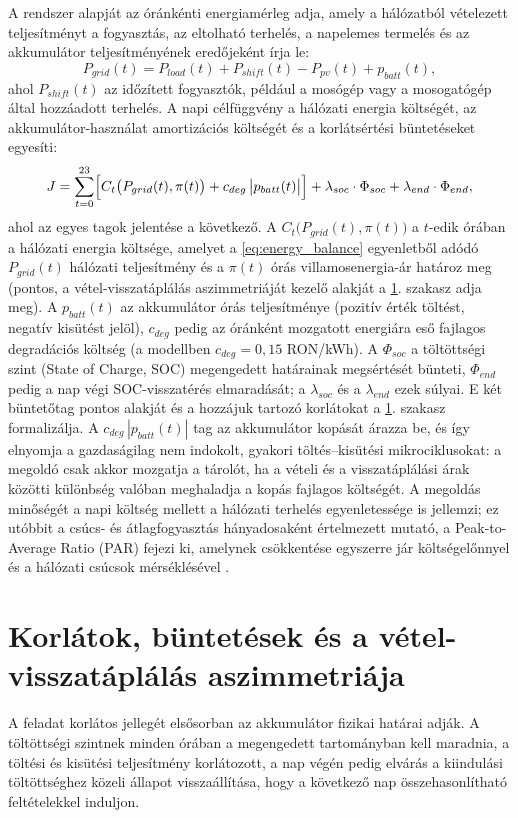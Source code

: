 A rendszer alapját az óránkénti energiamérleg adja, amely a hálózatból vételezett teljesítményt a fogyasztás, az eltolható terhelés, a napelemes termelés és az akkumulátor teljesítményének eredőjeként írja le:
\begin{equation}
P_{grid}(t) = P_{load}(t) + P_{shift}(t) - P_{pv}(t) + p_{batt}(t),
\label{eq:energy_balance}
\end{equation}
ahol $P_{shift}(t)$ az időzített fogyasztók, például a mosógép vagy a mosogatógép által hozzáadott terhelés. A napi célfüggvény a hálózati energia költségét, az akkumulátor-használat amortizációs költségét és a korlátsértési büntetéseket egyesíti:
\begin{equation}
J = \sum_{t=0}^{23} \Bigl[ C_t\bigl(P_{grid}(t),\pi(t)\bigr) + c_{deg}\,\bigl|p_{batt}(t)\bigr| \Bigr] + \lambda_{soc} \cdot \Phi_{soc} + \lambda_{end} \cdot \Phi_{end},
\label{eq:objective}
\end{equation}
ahol az egyes tagok jelentése a következő. A $C_t\bigl(P_{grid}(t),\pi(t)\bigr)$ a $t$-edik órában a hálózati energia költsége, amelyet a \eqref{eq:energy_balance} egyenletből adódó $P_{grid}(t)$ hálózati teljesítmény és a $\pi(t)$ órás villamosenergia-ár határoz meg (pontos, a vétel-visszatáplálás aszimmetriáját kezelő alakját a \ref{sec:korlatok}. szakasz adja meg). A $p_{batt}(t)$ az akkumulátor órás teljesítménye (pozitív érték töltést, negatív kisütést jelöl), $c_{deg}$ pedig az óránként mozgatott energiára eső fajlagos degradációs költség (a modellben $c_{deg}=0{,}15$ RON/kWh). A $\Phi_{soc}$ a töltöttségi szint (State of Charge, SOC) megengedett határainak megsértését bünteti, $\Phi_{end}$ pedig a nap végi SOC-visszatérés elmaradását; a $\lambda_{soc}$ és a $\lambda_{end}$ ezek súlyai. E két büntetőtag pontos alakját és a hozzájuk tartozó korlátokat a \ref{sec:korlatok}. szakasz formalizálja. A $c_{deg}\,|p_{batt}(t)|$ tag az akkumulátor kopását árazza be, és így elnyomja a gazdaságilag nem indokolt, gyakori töltés--kisütési mikrociklusokat: a megoldó csak akkor mozgatja a tárolót, ha a vételi és a visszatáplálási árak közötti különbség valóban meghaladja a kopás fajlagos költségét. A megoldás minőségét a napi költség mellett a hálózati terhelés egyenletessége is jellemzi; ez utóbbit a csúcs- és átlagfogyasztás hányadosaként értelmezett mutató, a Peak-to-Average Ratio (PAR) fejezi ki, amelynek csökkentése egyszerre jár költségelőnnyel és a hálózati csúcsok mérséklésével \cite{MohsenianRad2010}.

\section{Korlátok, büntetések és a vétel-visszatáplálás aszimmetriája}\label{sec:korlatok}
A feladat korlátos jellegét elsősorban az akkumulátor fizikai határai adják. A töltöttségi szintnek minden órában a megengedett tartományban kell maradnia, a töltési és kisütési teljesítmény korlátozott, a nap végén pedig elvárás a kiindulási töltöttséghez közeli állapot visszaállítása, hogy a következő nap összehasonlítható feltételekkel induljon.

